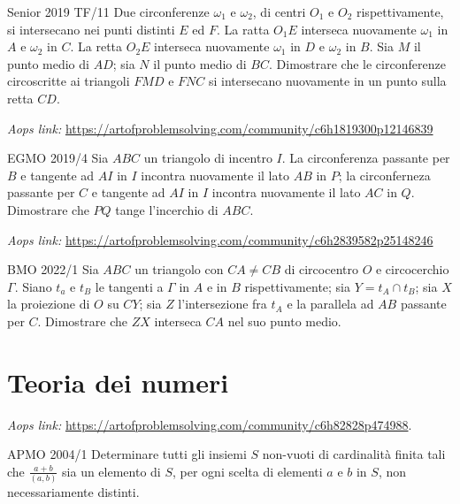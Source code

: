 \documentclass{article}
\begin{document}
\begin{proposition}{Senior 2019 TF/11}{}
	Due circonferenze $\omega_1$ e $\omega_2$, di centri $O_1$ e $O_2$
	rispettivamente, si intersecano nei punti distinti $E$ ed $F$.
	La ratta $O_1E$ interseca nuovamente $\omega_1$ in $A$ e $\omega_2$ in $C$.
	La retta $O_2E$ interseca nuovamente $\omega_1$ in $D$ e $\omega_2$ in $B$.
	Sia $M$ il punto medio di $AD$; sia $N$ il punto medio di $BC$. Dimostrare
	che le circonferenze circoscritte ai triangoli $FMD$ e $FNC$
	si intersecano nuovamente in un punto sulla retta $CD$.
\end{proposition}

\vspace{0.5cm}
\textit{Aops link:}
\href{https://artofproblemsolving.com/community/c6h1819300p12146839}
{https://artofproblemsolving.com/community/c6h1819300p12146839}
\begin{proposition}{EGMO 2019/4}{}
	Sia $ABC$ un triangolo di incentro $I$.
	La circonferenza passante per $B$ e tangente ad $AI$ in $I$
	incontra nuovamente il lato $AB$ in $P$; la circonferneza
	passante per $C$ e tangente ad $AI$ in $I$ incontra nuovamente
	il lato $AC$ in $Q$. Dimostrare che $PQ$ tange l'incerchio di $ABC$.
\end{proposition}

\vspace{0.5cm}
\textit{Aops link:}
\href{https://artofproblemsolving.com/community/c6h2839582p25148246}
{https://artofproblemsolving.com/community/c6h2839582p25148246}
\begin{proposition}{BMO 2022/1}{}
	Sia $ABC$ un triangolo con $CA\ne CB$ di circocentro $O$
	e circocerchio $\Gamma$. Siano $t_a$ e $t_B$ le tangenti a $\Gamma$
	in $A$ e in $B$ rispettivamente; sia $Y=t_A\cap t_B$; sia
	$X$ la proiezione di $O$ su $CY$; sia $Z$
	l'intersezione fra $t_A$ e la parallela ad $AB$ passante per $C$.
	Dimostrare che $ZX$ interseca $CA$ nel suo punto medio.
\end{proposition}

\pagebreak
\section{Teoria dei numeri}

\textit{Aops link:}
\href{https://artofproblemsolving.com/community/c6h82828p474988}
{https://artofproblemsolving.com/community/c6h82828p474988}.

\begin{proposition}{APMO 2004/1}{}
	Determinare tutti gli insiemi $S$ non-vuoti di cardinalità finita
	tali che $\frac{a+b}{(a,b)}$ sia un elemento di $S$, per ogni scelta di
	elementi $a$ e $b$ in $S$, non necessariamente distinti.
\end{proposition}
\end{document}
